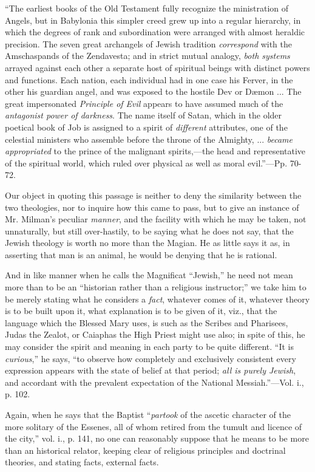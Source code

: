 ``The
earliest books of the Old Testament fully recognize the ministration
of Angels, but in Babylonia this simpler creed grew up into a regular
hierarchy, in which the degrees of rank and subordination were
arranged with almost heraldic precision. The seven great archangels of
Jewish tradition \emph{correspond} with the Amschaspands of the
Zendavesta; and in strict mutual analogy, \emph{both systems} arrayed
against each other a separate host of spiritual beings with distinct
powers and functions. Each nation, each individual had in one case his
Ferver, in the other his guardian angel, and was exposed to the
hostile Dev or Dæmon ... The great impersonated \emph{Principle of Evil}
appears to have assumed much of the \emph{antagonist power of darkness}.
The name itself of Satan, which in the older poetical book of Job is
assigned to a spirit of \emph{different} attributes, one of the
celestial ministers who assemble before the throne of the Almighty,
... \emph{became appropriated} to the prince of the malignant
spirits,—the head and representative of the spiritual world, which
ruled over physical as well as moral evil.''—Pp. 70-72.

Our object in quoting this passage is neither to
deny the similarity between the two theologies, nor to inquire how this came to pass, but to give an instance of Mr. Milman's
peculiar \emph{manner}, and the facility with which he may be taken,
not unnaturally, but still over-hastily, to be saying what he does not
say, that the Jewish theology is worth no more than the Magian. He as
little says it as, in asserting that man is an animal, he would be
denying that he is rational.

And in like manner when he calls the Magnificat ``Jewish,''
he need not mean more than to be an ``historian rather than a religious
instructor;'' we take him to be merely stating what he considers a \emph{fact},
whatever comes of it, whatever theory is to be built upon it, what
explanation is to be given of it, viz., that the language which the
Blessed Mary uses, is such as the Scribes and Pharisees, Judas the
Zealot, or Caiaphas the High Priest might use also; in spite of this,
he may consider the spirit and meaning in each party to be quite
different. ``It is \emph{curious},'' he says, ``to observe how completely and
exclusively consistent every expression appears with the state of
belief at that period; \emph{all is purely Jewish}, and accordant with
the prevalent expectation of the National Messiah.''—Vol. i., p. 102.

Again, when he says that the Baptist ``\emph{partook} of
the ascetic character of the more solitary of the Essenes, all of whom
retired from the tumult and licence of the city,'' vol. i., p. 141, no
one can reasonably suppose that he means to be more than an historical
relator, keeping clear of religious principles and doctrinal theories,
and stating facts, external facts.

